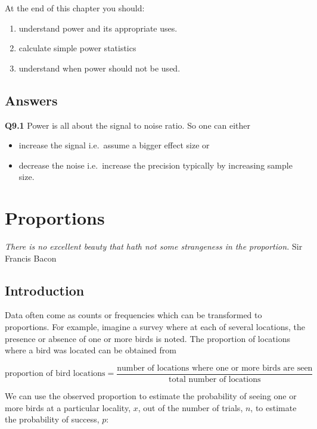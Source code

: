 \documentclass[
  oneside]{krantz}
\providecommand{\tightlist}{%
  \setlength{\itemsep}{0pt}\setlength{\parskip}{0pt}}
\begin{document}
At the end of this chapter you should:

\begin{enumerate}
\def\labelenumi{\arabic{enumi}.}
\tightlist
\item
  understand power and its appropriate uses.
\item
  calculate simple power statistics
\item
  understand when power should not be used.
\end{enumerate}

\hypertarget{ANSpower}{%
\section{Answers}\label{ANSpower}}

\textbf{Q9.1} Power is all about the signal to noise ratio. So one can either

\begin{itemize}
\tightlist
\item
  increase the signal i.e.~assume a bigger effect size or
\item
  decrease the noise i.e.~increase the precision typically by increasing sample size.
\end{itemize}

\hypertarget{proportions}{%
\chapter{Proportions}\label{proportions}}

\emph{There is no excellent beauty that hath not some strangeness in the proportion.}
Sir Francis Bacon \citeyearpar{Bacon1696}

\hypertarget{INTprop}{%
\section{Introduction}\label{INTprop}}

Data often come as counts or frequencies which can be transformed to proportions. For example, imagine a survey where at each of several locations, the presence or absence of one or more birds is noted. The proportion of locations where a bird was located can be obtained from

\[\textrm{proportion of bird locations} = \frac{\textrm{number of locations where one or more birds are seen}}{\textrm{total number of locations}}\]

We can use the observed proportion to estimate the probability of seeing one or more birds at a particular locality, \(x\), out of the number of trials, \(n\), to estimate the probability of success, \(p\):
\end{document}
